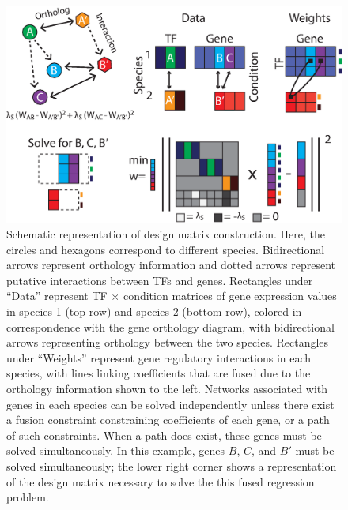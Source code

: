 \documentclass[11pt]{article}
\begin{document}



\pagebreak
\begin{figure}[h!]
    \centering
    \includegraphics[scale=.5,trim=0mm 0mm 0mm 0mm,clip]{party3.eps}
    \caption{\label{cartoon} Schematic representation of design matrix construction. Here, the circles and hexagons correspond to different species. Bidirectional arrows represent orthology information and dotted arrows represent putative interactions between TFs and genes. Rectangles under ``Data'' represent TF $\times$ condition matrices of gene expression values in species 1 (top row) and species 2 (bottom row), colored in correspondence with the gene orthology diagram, with bidirectional arrows representing orthology between the two species. Rectangles under ``Weights'' represent gene regulatory interactions in each species, with lines linking coefficients that are fused due to the orthology information shown to the left. Networks associated with genes in each species can be solved independently unless there exist a fusion constraint constraining coefficients of each gene, or a path of such constraints. When a path does exist, these genes must be solved simultaneously. In this example, genes $B$, $C$, and $B'$ must be solved simultaneously; the lower right corner shows a representation of the design matrix necessary to solve the this fused regression problem.
    }
\end{figure}
\pagebreak
\end{document}
